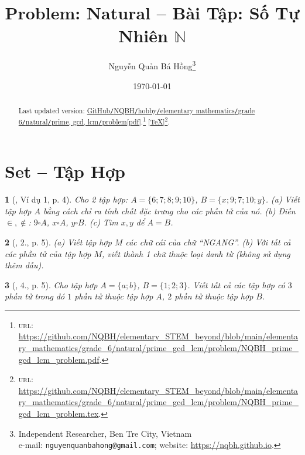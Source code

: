\documentclass{article}
\title{Problem: Natural -- Bài Tập: Số Tự Nhiên $\mathbb{N}$}
\author{Nguyễn Quản Bá Hồng\footnote{Independent Researcher, Ben Tre City, Vietnam\\e-mail: \texttt{nguyenquanbahong@gmail.com}; website: \url{https://nqbh.github.io}.}}
\date{\today}
\newtheorem{baitoan}{}
\begin{document}
\maketitle
\begin{abstract}
	Last updated version: \href{https://github.com/NQBH/elementary_STEM_beyond/blob/main/elementary_mathematics/grade_6/natural/prime_gcd_lcm/problem/NQBH_prime_gcd_lcm_problem.pdf}{GitHub{\tt/}NQBH{\tt/}hobby{\tt/}elementary mathematics{\tt/}grade 6{\tt/}natural{\tt/}prime, gcd, lcm{\tt/}problem[pdf]}.\footnote{\textsc{url}: \url{https://github.com/NQBH/elementary_STEM_beyond/blob/main/elementary_mathematics/grade_6/natural/prime_gcd_lcm/problem/NQBH_prime_gcd_lcm_problem.pdf}.} [\href{https://github.com/NQBH/elementary_STEM_beyond/blob/main/elementary_mathematics/grade_6/natural/prime_gcd_lcm/problem/NQBH_prime_gcd_lcm_problem.tex}{\TeX}]\footnote{\textsc{url}: \url{https://github.com/NQBH/elementary_STEM_beyond/blob/main/elementary_mathematics/grade_6/natural/prime_gcd_lcm/problem/NQBH_prime_gcd_lcm_problem.tex}.}. 
\end{abstract}
\tableofcontents


\section{Set -- Tập Hợp}

\begin{baitoan}[\cite{Tuyen_Toan_6}, Ví dụ 1, p. 4]
	Cho 2 tập hợp: $A = \{6;7;8;9;10\}$, $B = \{x;9;7;10;y\}$. (a) Viết tập hợp $A$ bằng cách chỉ ra tính chất đặc trưng cho các phần tử của nó. (b) Điền $\in,\notin$: $9\square A$, $x\square A$, $y\square B$. (c) Tìm $x,y$ để $A = B$.
\end{baitoan}

\begin{baitoan}[\cite{Tuyen_Toan_6}, 2., p. 5]
	(a) Viết tập hợp $M$ các chữ cái của chữ ``NGANG''. (b) Với tất cả các phần tử của tập hợp $M$, viết thành 1 chữ thuộc loại danh từ (không sử dụng thêm dấu).
\end{baitoan}

\begin{baitoan}[\cite{Tuyen_Toan_6}, 4., p. 5]
	Cho tập hợp $A = \{a;b\}$, $B = \{1;2;3\}$. Viết tất cả các tập hợp có $3$ phần tử trong đó $1$ phần tử thuộc tập hợp $A$, $2$ phần tử thuộc tập hợp $B$.
\end{baitoan}
\end{document}
